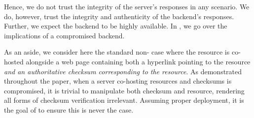 Hence, we do not trust the integrity of the server's responses in any scenario.
We do, however, trust the integrity and authenticity of the backend's responses.
Further, we expect the backend to be highly available. In ,
we go over the implications of a compromised backend.

As an aside, we consider here the standard non-\SYSTEM{} case where the resource
is co-hosted alongside a web page containing both a hyperlink pointing to the
resource \emph{and an authoritative checksum corresponding to the resource}. As
demonstrated throughout the paper, when a server co-hosting resources and
checksums is compromised, it is trivial to manipulate both checksum and
resource, rendering all forms of checksum verification irrelevant. Assuming
proper deployment, it is the goal of \SYSTEM{} to ensure this is never the case.
